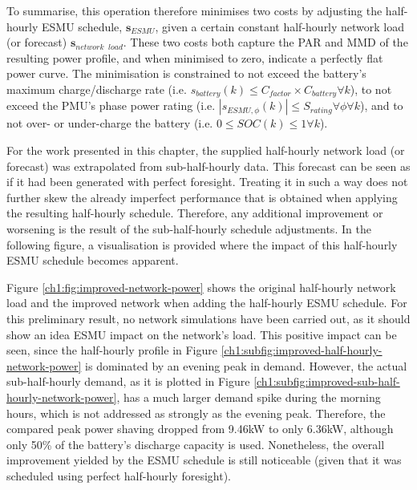 

To summarise, this operation therefore minimises two costs by adjusting the half-hourly ESMU schedule, $\textbf{s}_{ESMU}$, given a certain constant half-hourly network load (or forecast) $\textbf{s}_{network\;\;load}$.
These two costs both capture the PAR and MMD of the resulting power profile, and when minimised to zero, indicate a perfectly flat power curve.
The minimisation is constrained to not exceed the battery's maximum charge/discharge rate (i.e. $s_{battery}(k) \leq C_{factor} \times C_{battery} \forall k$), to not exceed the PMU's phase power rating (i.e. $\left|s_{ESMU,\phi}(k)\right| \leq S_{rating} \forall \phi \forall k$), and to not over- or under-charge the battery (i.e. $0 \leq SOC(k) \leq 1 \forall k$).

For the work presented in this chapter, the supplied half-hourly network load (or forecast) was extrapolated from sub-half-hourly data.
This forecast can be seen as if it had been generated with perfect foresight.
Treating it in such a way does not further skew the already imperfect performance that is obtained when applying the resulting half-hourly schedule.
Therefore, any additional improvement or worsening is the result of the sub-half-hourly schedule adjustments.
In the following figure, a visualisation is provided where the impact of this half-hourly ESMU schedule becomes apparent.



Figure \ref{ch1:fig:improved-network-power} shows the original half-hourly network load and the improved network when adding the half-hourly ESMU schedule.
For this preliminary result, no network simulations have been carried out, as it should show an idea ESMU impact on the network's load.
This positive impact can be seen, since the half-hourly profile in Figure \ref{ch1:subfig:improved-half-hourly-network-power} is dominated by an evening peak in demand.
However, the actual sub-half-hourly demand, as it is plotted in Figure \ref{ch1:subfig:improved-sub-half-hourly-network-power}, has a much larger demand spike during the morning hours, which is not addressed as strongly as the evening peak.
Therefore, the compared peak power shaving dropped from 9.46kW to only 6.36kW, although only 50\% of the battery's discharge capacity is used.
Nonetheless, the overall improvement yielded by the ESMU schedule is still noticeable (given that it was scheduled using perfect half-hourly foresight). 

